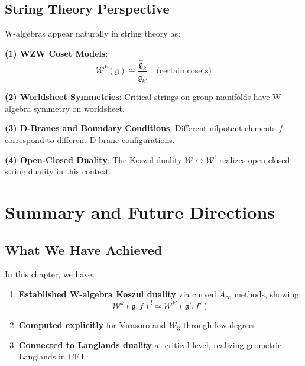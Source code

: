 \begin{principle}
\subsection{String Theory Perspective}

\begin{remark}
W-algebras appear naturally in string theory as:

\textbf{(1) WZW Coset Models}:
\begin{equation}
\mathcal{W}^k(\mathfrak{g}) \cong \frac{\widehat{\mathfrak{g}}_k}{\widehat{\mathfrak{g}}_{k'}} \quad \text{(certain cosets)}
\end{equation}

\textbf{(2) Worldsheet Symmetries}:
Critical strings on group manifolds have W-algebra symmetry on worldsheet.

\textbf{(3) D-Branes and Boundary Conditions}:
Different nilpotent elements $f$ correspond to different D-brane configurations.

\textbf{(4) Open-Closed Duality}:
The Koszul duality $\mathcal{W} \leftrightarrow \mathcal{W}^!$ realizes open-closed string duality in this context.
\end{remark}

\section{Summary and Future Directions}

\subsection{What We Have Achieved}

In this chapter, we have:

\begin{enumerate}
\item \textbf{Established W-algebra Koszul duality} via curved $A_\infty$ methods, showing:
\begin{equation}
\mathcal{W}^k(\mathfrak{g}, f)^! \simeq \mathcal{W}^{k'}(\mathfrak{g}', f')
\end{equation}

\item \textbf{Computed explicitly} for Virasoro and $\mathcal{W}_3$ through low degrees

\item \textbf{Connected to Langlands duality} at critical level, realizing geometric Langlands in CFT


\end{enumerate}
\end{principle}
